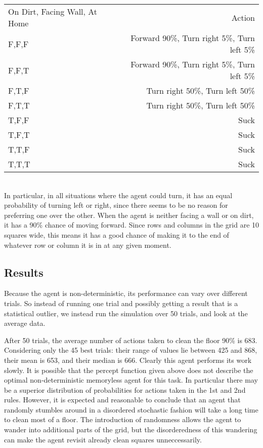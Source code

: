 \documentclass[10 pt.]{article}
\begin{document}
\begin{tabular}{ l r }
On Dirt, Facing Wall, At Home & Action \\
F,F,F & Forward 90\%, Turn right 5\%, Turn left 5\%\\
F,F,T & Forward 90\%, Turn right 5\%, Turn left 5\%\\
F,T,F & Turn right 50\%, Turn left 50\%\\
F,T,T & Turn right 50\%, Turn left 50\%\\
T,F,F & Suck \\
T,F,T & Suck \\
T,T,F & Suck \\
T,T,T & Suck \\
\end{tabular}\\

In particular, in all situations where the agent could turn, it has an equal probability of turning left or right,
since there seems to be no reason for preferring one over the other. When the agent is neither facing a wall or on
dirt, it has a 90\% chance of moving forward. Since rows and columns in the grid are 10 squares wide, this means it
has a good chance of making it to the end of whatever row or column it is in at any given moment.

\subsection{Results}
Because the agent is non-deterministic, its performance can vary over different trials. So instead of running one
trial and possibly getting a result that is a statistical outlier, we instead run the simulation over 50 trials,
and look at the average data.

After 50 trials, the average number of actions taken to clean the floor 90\% is 683. Considering only the 45 best
trials: their range of values lie between 425 and 868, their mean is 653, and their median is 666. Clearly this
agent performs its work slowly. It is possible that the percept function given above does not describe the optimal
non-deterministic memoryless agent for this task. In particular there may be a superior distribution of
probabilities for actions taken in the 1st and 2nd rules. However, it is expected and reasonable to conclude that an agent that
randomly stumbles around in a disordered stochastic fashion will take a long time to clean most of a floor.
The introduction of randomness allows the agent to wander into additional parts of the grid, but the disorderedness
of this wandering can make the agent revisit already clean squares unneccessarily.
\end{document}
